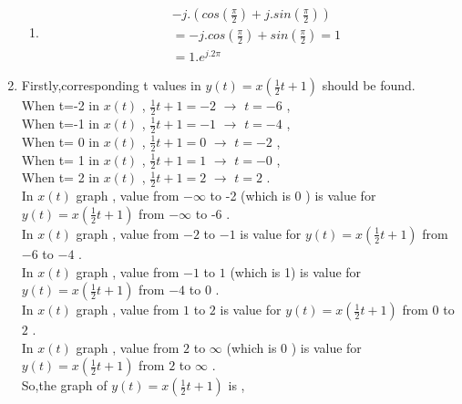\documentclass[10pt,a4paper, margin=1in]{article}
\begin{document}
\begin{enumerate}
\begin{enumerate}
    \item %
    \begin{align*}
    &-j.(cos(\frac{\pi}{2}) + j.sin(\frac{\pi}{2})) \\
    &= -j.cos(\frac{\pi}{2}) + sin(\frac{\pi}{2}) = 1 \\
    &= 1.e^{j.2\pi}
    \end{align*}
    
    \end{enumerate}


\item %
Firstly,corresponding t values in $y(t) = x(\frac{1}{2}t+1)$ should be found.\\ 

When t=-2 in $x(t)$ , $\frac{1}{2}t+1 = -2$ $\rightarrow$ $t=-6$ ,\\

When t=-1 in $x(t)$ , $\frac{1}{2}t+1 = -1$ $\rightarrow$ $t=-4$ ,\\

When t= 0 in $x(t)$ , $\frac{1}{2}t+1 =  0$ $\rightarrow$ $t=-2$ ,\\

When t= 1 in $x(t)$ , $\frac{1}{2}t+1 =  1$ $\rightarrow$ $t=-0$ ,\\

When t= 2 in $x(t)$ , $\frac{1}{2}t+1 =  2$ $\rightarrow$ $t= 2$ .\\

In $x(t)$ graph , value from $-\infty$ to -2 (which is 0 ) is value for $y(t) = x(\frac{1}{2}t+1)$ from $-\infty$ to -6 .\\
In $x(t)$ graph , value from $-2$ to $-1$ is value for $y(t) = x(\frac{1}{2}t+1)$ from $-6$ to $-4$ .\\
In $x(t)$ graph , value from $-1$ to $1$ (which is 1) is value for $y(t) = x(\frac{1}{2}t+1)$ from $-4$ to $0$ .\\
In $x(t)$ graph , value from $1$ to $2$ is value for $y(t) = x(\frac{1}{2}t+1)$ from $0$ to $2$ .\\
In $x(t)$ graph , value from $2$ to $\infty$ (which is 0 ) is value for $y(t) = x(\frac{1}{2}t+1)$ from $2$ to $\infty$ .\\

So,the graph of $y(t) = x(\frac{1}{2}t+1)$ is , 


\end{enumerate}
\end{document}
